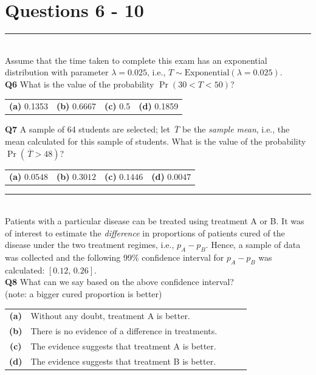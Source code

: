 \documentclass[12pt]{article}
\begin{document}
\newpage


\section*{Questions 6 - 10}



\rule{\linewidth}{1pt}
\quad\\
Assume that the time taken to complete this exam has an exponential distribution with parameter $\lambda = 0.025$, i.e., $T \sim \text{Exponential}(\lambda=0.025)$.\\[0.3cm]
{\bf Q6} What is the value of the probability $\Pr(30 < T < 50)$? \\[0.2cm]
\begin{tabular}{cccc}
{\bf(a)} 0.1353 & {\bf(b)} 0.6667  & {\bf(c)} 0.5 & {\bf(d)} 0.1859\\[0.6cm]
\end{tabular}

{\bf Q7} A sample of 64 students are selected; let $\,\overline{\!T}$ be the \emph{sample mean}, i.e., the mean calculated for this sample of students. What is the value of the probability $\Pr(\,\overline{\!T} > 48)$? \\[0.2cm]
\begin{tabular}{cccc}
{\bf(a)} $0.0548$ & {\bf(b)} $0.3012$ & {\bf(c)} $0.1446$  & {\bf(d)} $ 0.0047$ \\[0.6cm]
\end{tabular}


\rule{\linewidth}{1pt}
\quad\\
Patients with a particular disease can be treated using treatment A or B. It was of interest to estimate the \emph{difference} in proportions of patients cured of the disease under the two treatment regimes, i.e., $p_A - p_B$. Hence, a sample of data was collected and the following 99\% confidence interval for $p_A - p_B$ was calculated: $[0.12,\,0.26]$.\\[0.2cm]

{\bf Q8} What can we say based on the above confidence interval?\\
(note: a bigger cured proportion is better)\\[0.2cm]
\begin{tabular}{c@{\,\,\,}llll}
{\bf(a)} & Without any doubt, treatment A is better.\\[0.2cm]
{\bf(b)} & There is no evidence of a difference in treatments. \\[0.2cm]
{\bf(c)} & The evidence suggests that treatment A is better. \\[0.2cm]
{\bf(d)} & The evidence suggests that treatment B is better. \\[0.6cm]
\end{tabular}
\end{document}
